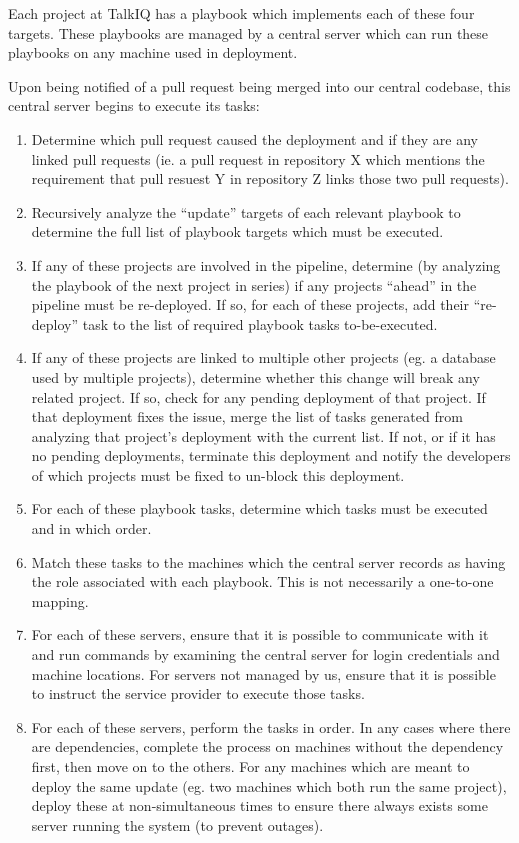 \documentclass[12pt]{article}
\begin{document}
Each project at TalkIQ has a playbook which implements each of these four targets. These playbooks are managed by a central server which can run these playbooks on any machine used in deployment.

Upon being notified of a pull request being merged into our central codebase, this central server begins to execute its tasks:
\begin{enumerate}
\item Determine which pull request caused the deployment and if they are any linked pull requests (ie. a pull request in repository X which mentions the requirement that pull resuest Y in repository Z links those two pull requests).
\item Recursively analyze the ``update'' targets of each relevant playbook to determine the full list of playbook targets which must be executed.
\item If any of these projects are involved in the pipeline, determine (by analyzing the playbook of the next project in series) if any projects ``ahead'' in the pipeline must be re-deployed. If so, for each of these projects, add their ``re-deploy'' task to the list of required playbook tasks to-be-executed.
\item If any of these projects are linked to multiple other projects (eg. a database used by multiple projects), determine whether this change will break any related project. If so, check for any pending deployment of that project. If that deployment fixes the issue, merge the list of tasks generated from analyzing that project's deployment with the current list. If not, or if it has no pending deployments, terminate this deployment and notify the developers of which projects must be fixed to un-block this deployment.
\item For each of these playbook tasks, determine which tasks must be executed and in which order.
\item Match these tasks to the machines which the central server records as having the role associated with each playbook. This is not necessarily a one-to-one mapping.
\item For each of these servers, ensure that it is possible to communicate with it and run commands by examining the central server for login credentials and machine locations. For servers not managed by us, ensure that it is possible to instruct the service provider to execute those tasks.
\item For each of these servers, perform the tasks in order. In any cases where there are dependencies, complete the process on machines without the dependency first, then move on to the others. For any machines which are meant to deploy the same update (eg. two machines which both run the same project), deploy these at non-simultaneous times to ensure there always exists some server running the system (to prevent outages).

\end{enumerate}
\end{document}
